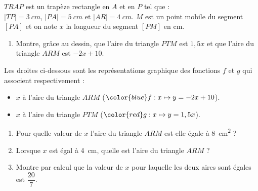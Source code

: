\documentclass[../partie1.tex]{subfiles}
\begin{document}
\begin{exercise}[points=3]
    \begin{minipage}{.48\linewidth}
        
    \end{minipage}
    \begin{minipage}{.48\linewidth}
        $TRAP$ est un trapèze rectangle en $A$ et en $P$ tel que :\\
    $|TP| = \SI{3}{cm}$, $|PA| = \SI{5}{cm}$ et $|AR|=\SI{4}{cm}$.\medbreak
    $M$ est un point mobile du segment $[PA]$ et on note $x$ la longueur du segment $[PM]$ en cm.
    \end{minipage}
    
    \begin{enumerate}[series=mine]
        \item Montre, grâce au dessin, que l'aire du triangle $PTM$ est $1,5x$ et que l'aire du triangle $ARM$ est $-2x+10$.
    \end{enumerate}

    Les droites ci-dessous sont les représentations graphique des fonctions $f$ et $g$ qui associent respectivement :
    \begin{itemize}[label=]
        \item $x$ à l'aire du triangle $ARM$ ($\color{blue}f:x\mapsto y= -2x+10$).
        \item $x$ à l'aire du triangle $PTM$ ($\color{red}g:x\mapsto y=1,5x$).
    \end{itemize}

    

    \begin{enumerate}[resume=mine]
        \item Pour quelle valeur de $x$ l'aire du triangle $ARM$ est-elle égale à \SI{8}{cm^2} ?
        \item Lorsque $x$ est égal à \SI{4}{cm}, quelle est l'aire du triangle $ARM$ ?
        \item Montre par calcul que la valeur de $x$ pour laquelle les deux aires sont égales est $\dfrac{20}{7}$.
    \end{enumerate}
\end{exercise}
\end{document}
